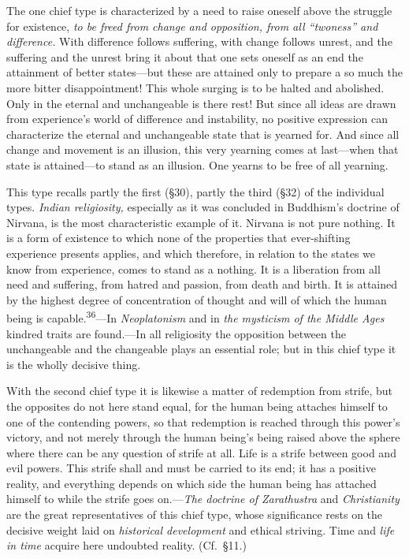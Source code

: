 \documentclass[12pt,a4paper]{book}
\newcommand{\opage}[1]{\marginnote{\footnotesize\textit{[#1]}}}
\begin{document}
The one chief type is characterized by a need to raise oneself above the struggle
for existence, \emph{to be freed from change and opposition, from all ``twoness''
and difference.} With difference follows suffering, with change follows unrest,
and the suffering and the unrest bring it about that one sets oneself as an end the
attainment of better states---but these are attained only to prepare a so much the
more bitter disappointment! This whole surging is to be halted and abolished. Only
in the eternal and unchangeable is there rest! But since all ideas are drawn from
experience's world of difference and instability, no positive expression can
characterize the eternal and unchangeable state that is yearned for. And since all
change and movement is an illusion, this very yearning comes at last---when that
state is attained---to stand as an illusion. One yearns to be free of all yearning.

This type recalls partly the first (§30), partly the third (§32) of the individual
types. \emph{Indian religiosity,} especially as it was concluded in Buddhism's
doctrine of Nirvana, is the most characteristic example of it. Nirvana is not pure
nothing. It is a form of existence to which none of the properties that
ever-shifting experience presents applies, and which 
\opage{82}therefore, in relation to the
states we know from experience, comes to stand as a nothing. It is a liberation
from all need and suffering, from hatred and passion, from death and birth. It is
attained by the highest degree of concentration of thought and will of which the
human being is capable.\textsuperscript{36}---In \emph{Neoplatonism} and in
\emph{the mysticism of the Middle Ages} kindred traits are found.---In all
religiosity the opposition between the unchangeable and the changeable plays an
essential role; but in this chief type it is the wholly decisive thing.

With the second chief type it is likewise a matter of redemption from strife, but
the opposites do not here stand equal, for the human being attaches himself to one
of the contending powers, so that redemption is reached through this power's
victory, and not merely through the human being's being raised above the sphere
where there can be any question of strife at all. Life is a strife between good and
evil powers. This strife shall and must be carried to its end; it has a positive
reality, and everything depends on which side the human being has attached himself
to while the strife goes on.---\emph{The doctrine of Zarathustra} and
\emph{Christianity} are the great representatives of this chief type, whose
significance rests on the decisive weight laid on \emph{historical development} and
ethical striving. Time and \emph{life in time} acquire here undoubted reality. (Cf.\
§11.)
\end{document}
